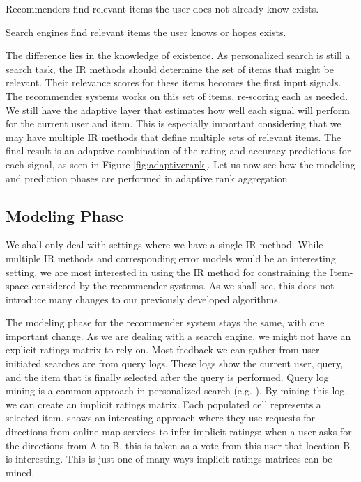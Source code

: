 \begin{itemize*}
  \item Recommenders find relevant items the user does not already know exists.
  \item Search engines find relevant items the user knows or hopes exists.
\end{itemize*}

The difference lies in the knowledge of existence.
As personalized search is still a search task, the IR methods should determine the set of items that might be relevant.
Their relevance scores for these items becomes the first input signals.
The recommender systems works on this set of items, re-scoring each as needed.
We still have the adaptive layer that estimates how well each signal will perform for the current user and item.
This is especially important considering that we may have multiple IR methods that define multiple sets of relevant items.
The final result is an adaptive combination of the rating and accuracy predictions for each signal,
as seen in Figure \ref{fig:adaptiverank}.
Let us now see how the modeling and prediction phases are performed in adaptive rank aggregation.



\subsection{Modeling Phase}

We shall only deal with settings where we have a single IR method.
While multiple IR methods and corresponding error models would be an interesting
setting, we are most interested in using the IR method for constraining the Item-space considered by the recommender systems.
As we shall see, this does not introduce many changes to our previously developed algorithms.

The modeling phase for the recommender system stays the same, with one important change.
As we are dealing with a search engine, we might not have an explicit ratings matrix to rely on.
Most feedback we can gather from user initiated searches are from query logs.
These logs show the current user, query, and the item that is finally selected after the query is performed.
Query log mining is a common approach in personalized search
(e.g. \cite{Liu2002, Sugiyama2004, Shen2005, Speretta2000}).
By mining this log, we can create an implicit ratings matrix.
Each populated cell represents a selected item.
\cite{Venetis2011} shows an interesting approach where they use requests for directions
from online map services to infer implicit ratings:
when a user asks for the directions from A to B, this is taken 
as a vote from this user that location B is interesting.
This is just one of many ways implicit ratings matrices can be mined.

